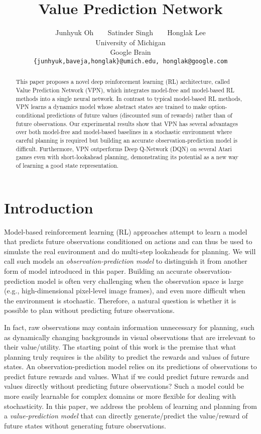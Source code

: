 \documentclass{article}
\title{Value Prediction Network}
\author{
  Junhyuk Oh \texttt{  } \texttt{  } 
  Satinder Singh \texttt{  } \texttt{  }
  Honglak Lee \\
  University of Michigan \\ Google Brain \\
\texttt{\{junhyuk,baveja,honglak\}@umich.edu, honglak@google.com}
}
\newcommand{\obsmodel}{{observation-prediction model}}
\newcommand{\valuemodel}{{value-prediction model}}
\newcommand{\cutabstractup}{\vspace*{-0.05in}}
\newcommand{\cutabstractdown}{\vspace*{-0.08in}}
\newcommand{\cutsectionup}{\vspace*{-0.05in}}
\newcommand{\cutsectiondown}{\vspace*{-0.03in}}
\begin{document}
\maketitle
\cutabstractup
\begin{abstract}
\vspace*{-0.1in}
This paper proposes a novel deep reinforcement learning (RL) architecture, called Value Prediction Network (VPN), which integrates model-free and model-based RL methods into a single neural network. In contrast to typical model-based RL methods, VPN learns a dynamics model whose abstract states are trained to make option-conditional predictions of future values (discounted sum of rewards) rather than of future observations. Our experimental results show that VPN has several advantages over both model-free and model-based baselines in a stochastic environment where careful planning is required but building an accurate observation-prediction model is difficult. Furthermore, VPN outperforms Deep Q-Network (DQN) on several Atari games even with short-lookahead planning, demonstrating its potential as a new way of learning a good state representation.
\end{abstract}
\cutabstractdown

\cutsectionup
\section{Introduction}
\cutsectiondown

Model-based reinforcement learning (RL) approaches attempt to learn a model that predicts future observations conditioned on actions and can thus be used to simulate the real environment and do multi-step lookaheads for planning. We will call such models an \textit{\obsmodel{}} to distinguish it from another form of model introduced in this paper. Building an accurate \obsmodel{} is often very challenging when the observation space is large~\citep{oh2015action,Finn2016UnsupervisedLF,Kalchbrenner2016VideoPN,Chiappa2017RecurrentES} (e.g., high-dimensional pixel-level image frames), and even more difficult when the environment is stochastic. 
Therefore, a natural question is whether it is possible to plan without predicting future observations. 

In fact, raw observations may contain information unnecessary for planning, such as dynamically changing backgrounds in visual observations that are irrelevant to their value/utility. The starting point of this work is the premise that what planning truly requires is the ability to predict the rewards and values of future states.
An \obsmodel{} relies on its predictions of observations to predict future rewards and values. 
What if we could predict future rewards and values directly without predicting future observations? Such a model could be more easily learnable for complex domains or more flexible for dealing with stochasticity. In this paper, we address the problem of learning and planning from a \textit{\valuemodel{}} that can directly generate/predict the value/reward of future states without generating future observations.
\end{document}
